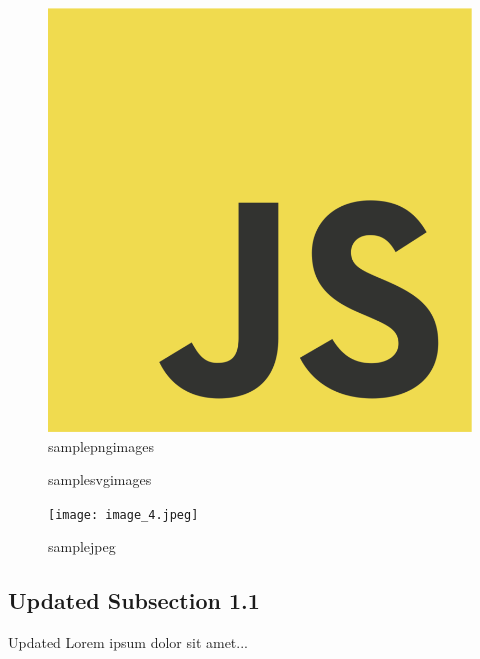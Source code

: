 \documentclass[conference]{IEEEtran}%
\begin{document}
    \begin{figure}[htbp] 
    \centerline{\includegraphics[width=\linewidth]{image_2.png}}
    \caption{samplepngimages}
    \label{fig:image_2.png}
    \end{figure}

        \begin{figure}[htbp] 
        \centering
        
        \caption{samplesvgimages}
        \label{fig:image_3.svg}
        \end{figure}

    \begin{figure}[htbp] 
    \centerline{\texttt{[image: image\_4.jpeg]}}
    \caption{samplejpeg}
    \label{fig:image_4.jpeg}
    \end{figure}%
\subsection{Updated Subsection 1.1}%
\label{subsec:UpdatedSubsection1.1}%
Updated  Lorem ipsum dolor sit amet...

%
\end{document}
